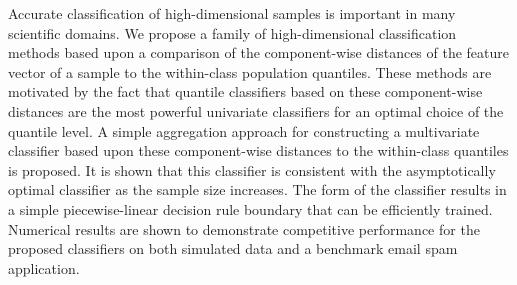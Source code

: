 
Accurate classification of high-dimensional samples is important in many
scientific domains.  We propose a family of high-dimensional classification
methods based upon a comparison of the component-wise distances of the feature
vector of a sample to the within-class population quantiles.  These methods are
motivated by the fact that quantile classifiers based on these component-wise
distances are the most powerful univariate classifiers for an optimal choice of
the quantile level.  A simple aggregation approach for constructing a
multivariate classifier based upon these component-wise distances to the
within-class quantiles is proposed.  It is shown that this classifier is
consistent with the asymptotically optimal classifier as the sample size
increases.  The form of the classifier results in a simple piecewise-linear
decision rule boundary that can be efficiently trained.  Numerical results are
shown to demonstrate competitive performance for the proposed classifiers on
both simulated data and a benchmark email spam application.




